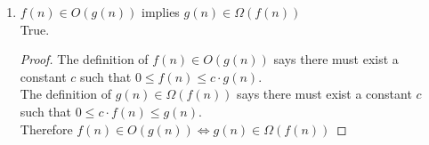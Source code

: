 \documentclass{article}
\begin{document}
\begin{enumerate}
\begin{enumerate}
\begin{proof}
                            \begin{align*}
                                2^{2n}&\leq c\cdot 2^n\\
                                (2^n)^2&\leq c\cdot 2^n\\
                                2^n&\not\leq \sqrt{c}\cdot 2^{n/2}
                            \end{align*}                      
                            As $c$ is constant, as $n$ approaches $\infty$ the LHS will become greater than the RHS. Therefore the implication is not true.
                        \end{proof}
                    \item $f(n)\in O(g(n))$ implies $g(n)\in\Omega(f(n))$\\
                        True.
                        \begin{proof}
                            The definition of $f(n)\in O(g(n))$ says there must exist a constant $c$ such that $0\leq f(n)\leq c\cdot g(n)$.\\
                            The definition of $g(n)\in\Omega(f(n))$ says there must exist a constant $c$ such that $0\leq c\cdot f(n)\leq g(n)$.\\
                            Therefore $f(n)\in O(g(n)) \Leftrightarrow g(n)\in\Omega(f(n))$


\end{proof}
\end{enumerate}
\end{enumerate}
\end{document}
